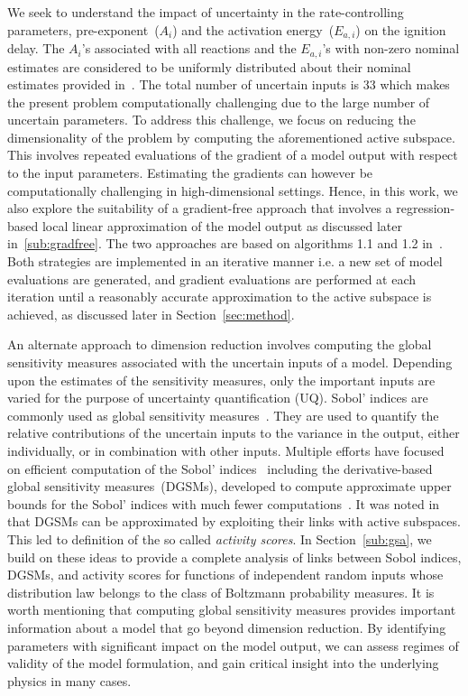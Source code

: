 We seek to understand the impact of uncertainty in the
rate-controlling parameters, pre-exponent~($A_i$) and the activation
energy~($E_{a,i}$) on the ignition delay. The $A_i$'s associated with all
reactions and the $E_{a,i}$'s with non-zero nominal estimates
are considered to be uniformly distributed about their nominal estimates provided
in~\cite{Yetter:1991}.  The total number of uncertain inputs is 33 which makes
the present problem computationally challenging due to the large number of 
uncertain parameters.  
To address this challenge, we focus on reducing the dimensionality
of the problem by computing the aforementioned active subspace.
This involves repeated evaluations of the gradient of a model output with
respect to the input parameters. Estimating the
gradients can however be computationally challenging in high-dimensional settings. 
Hence, in this work, we also explore the suitability of a gradient-free
approach that involves a regression-based local linear approximation of
the model output as discussed later in~\ref{sub:gradfree}. The two approaches
 are based on
algorithms 1.1 and 1.2 in~\cite{Constantine:2015}. Both strategies
are implemented in an iterative manner i.e. a new set of model evaluations are
generated, and gradient evaluations are performed at each iteration until 
a reasonably accurate approximation to the active subspace is achieved, as
discussed later in Section~\ref{sec:method}. 

An alternate approach to dimension reduction involves computing the global
sensitivity measures associated with the uncertain inputs of a model. Depending
upon the estimates of the sensitivity measures, only the important inputs are
varied for the purpose of uncertainty quantification (UQ). Sobol' indices are
commonly used as global sensitivity measures~\cite{Sobol:2001}. They are
used to quantify the relative contributions of the uncertain inputs to the variance
in the output, either individually, or in combination with other inputs. 
Multiple efforts have focused on efficient computation of the Sobol' 
indices~\cite{Sudret:2008,Plischke:2013,Tissot:2015,Li:2016} including the 
derivative-based global sensitivity measures~(DGSMs), developed to
compute approximate upper bounds for the Sobol' indices with much fewer
computations~\cite{Sobol:2009, Lamboni:2013}. It was noted
in~\cite{Diaz:2016,Constantine:2017} that DGSMs can be approximated by
exploiting their links with active subspaces. This led to definition of the so
called \emph{activity scores}. In Section~\ref{sub:gsa}, we build on these
ideas to provide a complete analysis of links between Sobol indices, DGSMs, and
activity scores for functions of independent random inputs whose distribution
law belongs to the class of Boltzmann probability measures. 
It is worth mentioning that computing global sensitivity measures provides 
important information about a model that go beyond dimension reduction. By 
identifying parameters with significant impact on the model output, we can assess
regimes of validity of the model formulation, and gain critical insight into the
underlying physics in many cases. 
 
